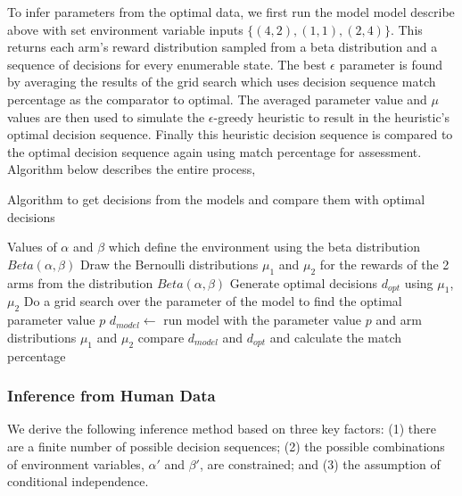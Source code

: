 To infer parameters from the optimal data, we first run the model model describe above with set environment variable inputs $\{(4,2), (1,1), (2,4)\}$. This returns each arm's reward distribution sampled from a beta distribution and a sequence of decisions for every enumerable state. The best $\epsilon$ parameter is found by averaging the results of the grid search which uses decision sequence match percentage as the comparator to optimal. The averaged parameter value and $\mu$ values are then used to simulate the $\epsilon$-greedy heuristic to result in the heuristic's optimal decision sequence. Finally this heuristic decision sequence is compared to the optimal decision sequence again using match percentage for assessment.
Algorithm below describes the entire process,
\begin{algorithm}[H]
\caption{Algorithm to get decisions from the models and compare them with optimal decisions}
\label{algoOptimalModelComparison}
\renewcommand{\algorithmicrequire}{\textbf{Input:}}
\renewcommand{\algorithmicensure}{\textbf{Output:}}
\begin{algorithmic}[1]
		\REQUIRE Values of $\alpha$ and $\beta$ which define the environment using the beta distribution $Beta(\alpha,\beta)$
	\STATE Draw the Bernoulli distributions $\mu_1$ and $\mu_2$ for the rewards of the 2 arms from the distribution $Beta(\alpha,\beta)$
	\STATE Generate optimal decisions $d_{opt}$ using $\mu_1$, $\mu_2$
			\STATE Do a grid search over the parameter of the model to find the optimal parameter value $p$
			\STATE $d_{model} \leftarrow $ run model with the parameter value $p$ and arm distributions $\mu_1$ and $\mu_2$
			\STATE compare $d_{model}$ and $d_{opt}$ and calculate the match percentage
		\ENDFOR
\end{algorithmic}
\end{algorithm}

\subsubsection{Inference from Human Data}
We derive the following inference method based on three key factors: (1) there are a finite number of possible decision sequences; (2) the possible combinations of environment variables, $\alpha'$ and $\beta'$, are constrained; and (3) the assumption of conditional independence.

